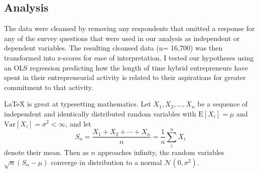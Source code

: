 \documentclass{article}
\begin{document}
\subsection{Analysis}
The data were cleansed by removing any respondents that omitted a response for any of the survey questions that were used in our analysis as independent or dependent variables.  The resulting cleansed data (n= 16,700) was then transformed into z-scores for ease of interpretation.  I tested our hypotheses using an OLS regression predicting how the length of time hybrid entrepreneurs have spent in their entrepreneurial activity is related to their aspirations for greater commitment to that activity.

\LaTeX{} is great at typesetting mathematics. Let $X_1, X_2, \ldots, X_n$ be a sequence of independent and identically distributed random variables with $\text{E}[X_i] = \mu$ and $\text{Var}[X_i] = \sigma^2 < \infty$, and let
\[S_n = \frac{X_1 + X_2 + \cdots + X_n}{n}
      = \frac{1}{n}\sum_{i}^{n} X_i\]
denote their mean. Then as $n$ approaches infinity, the random variables $\sqrt{n}(S_n - \mu)$ converge in distribution to a normal $\mathcal{N}(0, \sigma^2)$.
\end{document}
